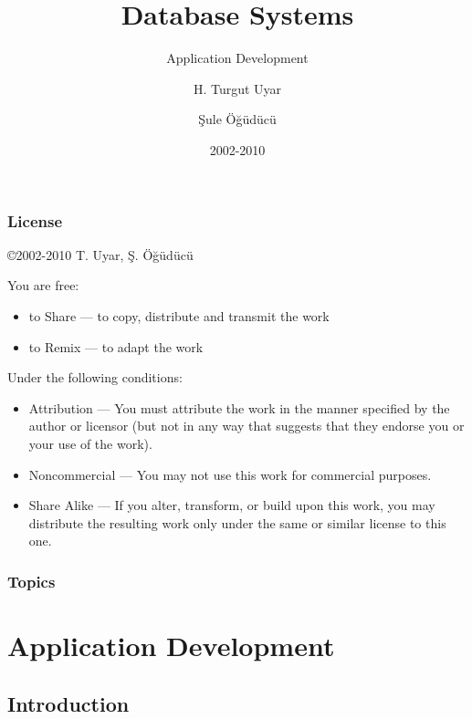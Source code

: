 \documentclass[dvipsnames]{beamer}
\title{Database Systems}
\subtitle{Application Development}
\author{H. Turgut Uyar \and Şule Öğüdücü}
\date{2002-2010}
\theoremstyle{plain}
\begin{document}
\begin{frame}
  \titlepage
\end{frame}

\begin{frame}
  \frametitle{License}

  \hfill
  \copyright 2002-2010 T. Uyar, Ş. Öğüdücü

  \vfill
  \begin{tiny}
    You are free:
    \begin{itemize}
      \item to Share — to copy, distribute and transmit the work
      \item to Remix — to adapt the work
    \end{itemize}

    Under the following conditions:
    \begin{itemize}
      \item Attribution — You must attribute the work in the manner specified by
        the author or licensor (but not in any way that suggests that they
        endorse you or your use of the work).

      \item Noncommercial — You may not use this work for commercial purposes.

      \item Share Alike — If you alter, transform, or build upon this work, you
        may distribute the resulting work only under the same or similar license
        to this one.
    \end{itemize}
  \end{tiny}
\end{frame}

\begin{frame}
  \frametitle{Topics}
  \tableofcontents
\end{frame}

\section{Application Development}

\subsection{Introduction}
\end{document}
